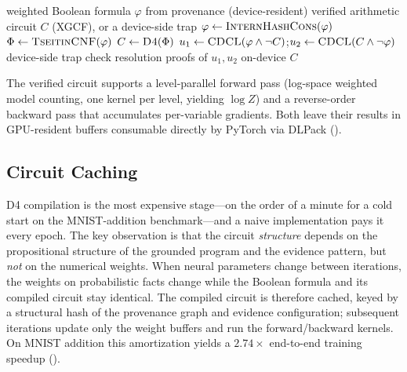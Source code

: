 \begin{algorithm}[htbp]
\caption{GPU-native verified knowledge compilation. The circuit is accepted only if proven equivalent to its source formula on-device.}
\label{alg:verifiedkc}
\begin{algorithmic}[1]
\Require weighted Boolean formula $\varphi$ from provenance (device-resident)
\Ensure verified arithmetic circuit $C$ (XGCF), or a device-side trap
\State $\varphi \gets \textsc{InternHashCons}(\varphi)$ 
\State $\Phi \gets \textsc{TseitinCNF}(\varphi)$ 
\State $C \gets \textsc{D4}(\Phi)$ 
\State $u_1 \gets \textsc{CDCL}(\varphi \land \lnot C)$;\quad $u_2 \gets \textsc{CDCL}(C \land \lnot \varphi)$
  \State device-side trap 
\EndIf
\State check resolution proofs of $u_1, u_2$ on-device
\State \Return $C$ 
\end{algorithmic}
\end{algorithm}

The verified circuit supports a level-parallel forward pass (log-space weighted model counting, one kernel per level, yielding $\log Z$) and a reverse-order backward pass that accumulates per-variable gradients. Both leave their results in GPU-resident buffers consumable directly by PyTorch via DLPack ().

\subsection{Circuit Caching}

D4 compilation is the most expensive stage---on the order of a minute for a cold start on the MNIST-addition benchmark---and a naive implementation pays it every epoch. The key observation is that the circuit \emph{structure} depends on the propositional structure of the grounded program and the evidence pattern, but \emph{not} on the numerical weights. When neural parameters change between iterations, the weights on probabilistic facts change while the Boolean formula and its compiled circuit stay identical. The compiled circuit is therefore cached, keyed by a structural hash of the provenance graph and evidence configuration; subsequent iterations update only the weight buffers and run the forward/backward kernels. On MNIST addition this amortization yields a $2.74\times$ end-to-end training speedup ().

